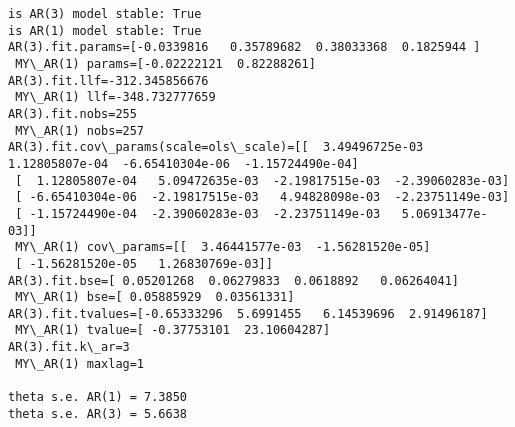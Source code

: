 \documentclass{article}
\begin{document}
    \begin{Verbatim}[commandchars=\\\{\}]
is AR(3) model stable: True
is AR(1) model stable: True
AR(3).fit.params=[-0.0339816   0.35789682  0.38033368  0.1825944 ] 
 MY\_AR(1) params=[-0.02222121  0.82288261] 
AR(3).fit.llf=-312.345856676 
 MY\_AR(1) llf=-348.732777659 
AR(3).fit.nobs=255 
 MY\_AR(1) nobs=257 
AR(3).fit.cov\_params(scale=ols\_scale)=[[  3.49496725e-03   1.12805807e-04  -6.65410304e-06  -1.15724490e-04]
 [  1.12805807e-04   5.09472635e-03  -2.19817515e-03  -2.39060283e-03]
 [ -6.65410304e-06  -2.19817515e-03   4.94828098e-03  -2.23751149e-03]
 [ -1.15724490e-04  -2.39060283e-03  -2.23751149e-03   5.06913477e-03]] 
 MY\_AR(1) cov\_params=[[  3.46441577e-03  -1.56281520e-05]
 [ -1.56281520e-05   1.26830769e-03]] 
AR(3).fit.bse=[ 0.05201268  0.06279833  0.0618892   0.06264041] 
 MY\_AR(1) bse=[ 0.05885929  0.03561331] 
AR(3).fit.tvalues=[-0.65333296  5.6991455   6.14539696  2.91496187] 
 MY\_AR(1) tvalue=[ -0.37753101  23.10604287] 
AR(3).fit.k\_ar=3 
 MY\_AR(1) maxlag=1 

theta s.e. AR(1) = 7.3850
theta s.e. AR(3) = 5.6638
    \end{Verbatim}
\end{document}
